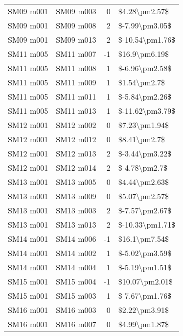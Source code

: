 \begin{longtable}{llrl}
 SM09 m001 &     SM09 m003 &       0 &    \$4.28\textbackslash pm2.57\$ \\
 SM09 m001 &     SM09 m008 &       2 &   \$-7.99\textbackslash pm3.05\$ \\
 SM09 m001 &     SM09 m013 &       2 &  \$-10.54\textbackslash pm1.76\$ \\
 SM11 m005 &     SM11 m007 &      -1 &    \$16.9\textbackslash pm6.19\$ \\
 SM11 m005 &     SM11 m008 &       1 &   \$-6.96\textbackslash pm2.58\$ \\
 SM11 m005 &     SM11 m009 &       1 &     \$1.54\textbackslash pm2.7\$ \\
 SM11 m005 &     SM11 m011 &       1 &   \$-5.84\textbackslash pm2.26\$ \\
 SM11 m005 &     SM11 m013 &       1 &  \$-11.62\textbackslash pm3.79\$ \\
 SM12 m001 &     SM12 m002 &       0 &    \$7.23\textbackslash pm1.94\$ \\
 SM12 m001 &     SM12 m012 &       0 &     \$8.41\textbackslash pm2.7\$ \\
 SM12 m001 &     SM12 m013 &       2 &   \$-3.44\textbackslash pm3.22\$ \\
 SM12 m001 &     SM12 m014 &       2 &    \$-4.78\textbackslash pm2.7\$ \\
 SM13 m001 &     SM13 m005 &       0 &    \$4.44\textbackslash pm2.63\$ \\
 SM13 m001 &     SM13 m009 &       0 &    \$5.07\textbackslash pm2.57\$ \\
 SM13 m001 &     SM13 m003 &       2 &   \$-7.57\textbackslash pm2.67\$ \\
 SM13 m001 &     SM13 m013 &       2 &  \$-10.33\textbackslash pm1.71\$ \\
 SM14 m001 &     SM14 m006 &      -1 &    \$16.1\textbackslash pm7.54\$ \\
 SM14 m001 &     SM14 m002 &       1 &   \$-5.02\textbackslash pm3.59\$ \\
 SM14 m001 &     SM14 m004 &       1 &   \$-5.19\textbackslash pm1.51\$ \\
 SM15 m001 &     SM15 m004 &      -1 &   \$10.07\textbackslash pm2.01\$ \\
 SM15 m001 &     SM15 m003 &       1 &   \$-7.67\textbackslash pm1.76\$ \\
 SM16 m001 &     SM16 m003 &       0 &    \$2.22\textbackslash pm3.91\$ \\
 SM16 m001 &     SM16 m007 &       0 &    \$4.99\textbackslash pm1.87\$ \\

\end{longtable}
